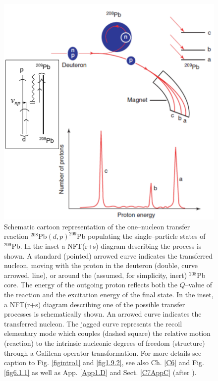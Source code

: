 \begin{figure}
\centerline {
\includegraphics*[width=12cm]{introduccion/figs/figintro2}
}
\caption{Schematic cartoon representation of the one--nucleon transfer reaction $^{208}$Pb$(d,p)^{209}$Pb populating the single--particle states of $^{209}$Pb. In the inset a NFT(r+s) diagram describing the process is shown. A standard (pointed) arrowed curve indicates the transferred nucleon, moving with the proton in the deuteron (double, curve arrowed, line), or around the (assumed, for simplicity, inert) $^{208}$Pb core. The energy of the outgoing proton reflects both the $Q$--value of the reaction and the excitation energy of the final state. In the inset, a NFT(r+s) diagram describing one of the possible transfer  processes is schematically shown. An arrowed curve indicates the transferred nucleon. The jagged curve represents the recoil elementary mode which couples (dashed square) the relative motion (reaction) to the intrinsic nucleonic degrees of freedom  (structure) through a Galilean operator transformation. For more details see caption to Fig. \ref{figintro1} and \ref{fig1.9.2}, see also Ch. \ref{C6} and Fig. \ref{fig6.1.1} as well as App. \ref{App1.D} and Sect. \ref{C7AppC} (after \cite{Mottelson:76b}).}
\label{figintro2}
\end{figure}
